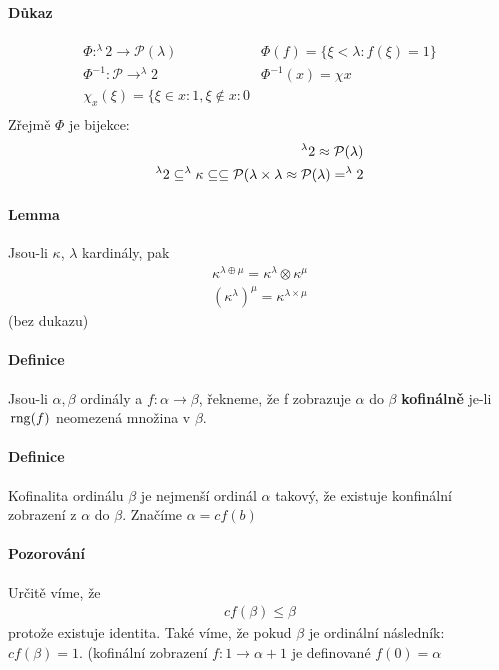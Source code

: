 \documentclass[a4paper,12pt,titlepage]{article}
\begin{document}
\paragraph{Důkaz}
\begin{align}
	\Phi: ^\lambda 2 \to \mathcal{P}(\lambda)  & \Phi(f) = \{ \xi < \lambda :
	f(\xi) = 1 \}\\
	\Phi^{-1}  : \mathcal{P} \to ^\lambda 2 & \Phi^{-1}  ( x) = \chi x \quad \\
	\chi_x(\xi) = \{ \xi \in x: 1, \xi \nin x: 0 \\
\end{align}
Zřejmě $\Phi$ je bijekce:
\begin{align}
	^\lambda 2 \approx \mathcal{P}(\lambda) \\
	^\lambda 2 \subseteq ^\lambda \kappa \subseteq \subseteq \mathcal{P}(\lambda
	\times \lambda \approx \mathcal{P} (\lambda) = ^\lambda 2
\end{align}

\paragraph{Lemma}
Jsou-li $\kappa$, $\lambda$ kardinály, pak 
\begin{align}
	\kappa^{\lambda \oplus \mu} = \kappa^\lambda \otimes \kappa^\mu \\
	(\kappa^\lambda)^\mu = \kappa^{\lambda \times \mu} 
\end{align}
(bez dukazu)

\paragraph{Definice}
Jsou-li $\alpha, \beta$ ordinály a $f: \alpha \to \beta$, řekneme, že f
zobrazuje $\alpha$ do $\beta$ \textbf{kofinálně} je-li $\operatorname*{\,rng}(f)$ neomezená
množina v $\beta$.
\paragraph{Definice}
Kofinalita ordinálu $\beta$ je nejmenší ordinál $\alpha$ takový, že existuje
konfinální zobrazení z $\alpha$ do $\beta$. Značíme $\alpha = cf(b)$
\paragraph{Pozorování}
Určitě víme, že 
\begin{align}
	cf(\beta) \le \beta
\end{align}
protože existuje identita. Také víme, že pokud $\beta$ je ordinální následník:
$cf(\beta) = 1$. (kofinální zobrazení $f: 1 \to \alpha + 1$ je definované $f(0) =
\alpha$
\end{document}

